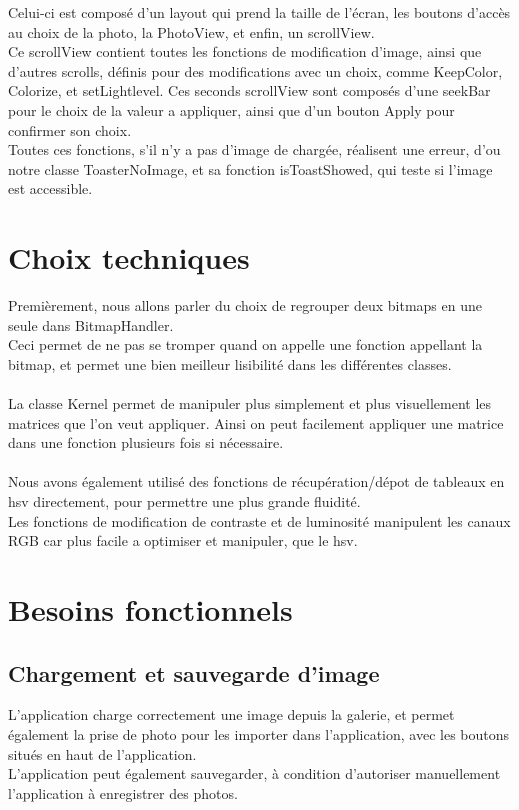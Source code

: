\documentclass[12pt]{article}
\begin{document}
    Celui-ci est composé d'un layout qui prend la taille de l'écran, les boutons d'accès au choix de la photo, la PhotoView, et enfin, un scrollView.\\
    Ce scrollView contient toutes les fonctions de modification d'image, ainsi que d'autres scrolls, définis pour des modifications avec un choix, comme KeepColor, Colorize, et setLightlevel.
    Ces seconds scrollView sont composés d'une seekBar pour le choix de la valeur a appliquer, ainsi que d'un bouton Apply pour confirmer son choix.\\
    Toutes ces fonctions, s'il n'y a pas d'image de chargée, réalisent une erreur, d'ou notre classe ToasterNoImage, et sa fonction isToastShowed, qui teste si l'image est accessible.\\

    \bigskip

\section{Choix techniques}
    Premièrement, nous allons parler du choix de regrouper deux bitmaps en une seule dans BitmapHandler. \\
    Ceci permet de ne pas se tromper quand on appelle une fonction appellant la bitmap, et permet une bien meilleur lisibilité dans les différentes classes.\\
    \\
    La classe Kernel permet de manipuler plus simplement et plus visuellement les matrices que l'on veut appliquer. Ainsi on peut facilement appliquer une matrice dans une fonction plusieurs fois si nécessaire.
    \\
    \\
    Nous avons également utilisé des fonctions de récupération/dépot de tableaux en hsv directement, pour permettre une plus grande fluidité.
    \\
    Les fonctions de modification de contraste et de luminosité manipulent les canaux RGB car plus facile a optimiser et manipuler, que le hsv.



\section{Besoins fonctionnels}



    \subsection{Chargement et sauvegarde d'image}
    L'application charge correctement une image depuis la galerie, et permet également la prise de photo pour les importer dans l'application,
     avec les boutons situés en haut de l'application.\\
    L'application peut également sauvegarder, à condition d'autoriser manuellement l'application à enregistrer des photos.\\
    \\
\end{document}
